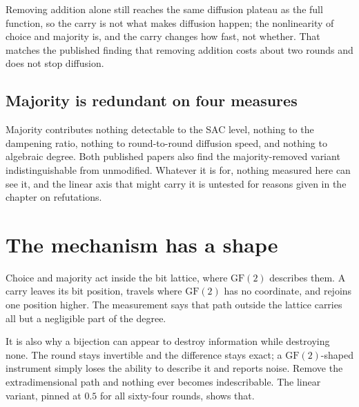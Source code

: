 Removing addition alone still reaches the same diffusion plateau as the full function, so the carry is not what makes diffusion happen; the nonlinearity of choice and majority is, and the carry changes how fast, not whether. That matches the published finding that removing addition costs about two rounds and does not stop diffusion.

\subsection{Majority is redundant on four measures}

Majority contributes nothing detectable to the SAC level, nothing to the dampening ratio, nothing to round-to-round diffusion speed, and nothing to algebraic degree. Both published papers also find the majority-removed variant indistinguishable from unmodified. Whatever it is for, nothing measured here can see it, and the linear axis that might carry it is untested for reasons given in the chapter on refutations.

\section{The mechanism has a shape}

Choice and majority act inside the bit lattice, where \(\mathrm{GF}(2)\) describes them. A carry leaves its bit position, travels where \(\mathrm{GF}(2)\) has no coordinate, and rejoins one position higher. The measurement says that path outside the lattice carries all but a negligible part of the degree.

It is also why a bijection can appear to destroy information while destroying none. The round stays invertible and the difference stays exact; a \(\mathrm{GF}(2)\)-shaped instrument simply loses the ability to describe it and reports noise. Remove the extradimensional path and nothing ever becomes indescribable. The linear variant, pinned at \(0.5\) for all sixty-four rounds, shows that.
